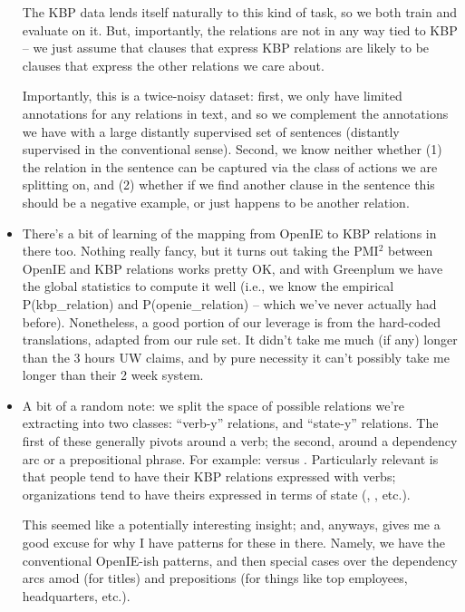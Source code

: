 \begin{itemize}
    The KBP data lends itself naturally to this kind of task, so we both
    train and evaluate on it. But, importantly, the relations are not
    in any way tied to KBP -- we just assume that clauses that express
    KBP relations are likely to be clauses that express the other relations
    we care about.

    Importantly, this is a twice-noisy dataset: first, we only have limited
    annotations for any relations in text, and so we complement the annotations
    we have with a large distantly supervised set of sentences (distantly supervised
    in the conventional sense).
    Second, we know neither whether (1) the relation in the sentence can be captured
    via the class of actions we are splitting on, and (2) whether if we find another
    clause in the sentence this should be a negative example, or just happens to be
    another relation.

  \item There's a bit of learning of the mapping from OpenIE to KBP
    relations in there too. Nothing really fancy, but it turns out
    taking the PMI$^2$ between OpenIE and KBP relations works pretty OK,
    and with Greenplum we have the global statistics to compute it well
    (i.e., we know the empirical P(kbp\_relation) and P(openie\_relation) --
    which we've never actually had before).
    Nonetheless, a good portion of our leverage is from the hard-coded
    translations, adapted from our rule set.
    It didn't take me much (if any) longer than the 3 hours UW claims,
    and by pure necessity it can't possibly take me longer than their
    2 week system.
  
  \item A bit of a random note: 
      we split the space of possible relations we're extracting into two classes:
      ``verb-y'' relations, and ``state-y'' relations. The first of these
      generally pivots around a verb; the second, around a dependency
      arc or a prepositional phrase. For example:
       versus
      .
      Particularly relevant is that people tend to have their KBP relations
      expressed with verbs; organizations tend to have theirs expressed
      in terms of state (,
      , etc.).

      This seemed like a potentially interesting insight; and, anyways,
      gives me a good excuse for why I have patterns for these in there.
      Namely, we have the conventional OpenIE-ish patterns, and then
      special cases over the dependency arcs amod (for titles) and
      prepositions (for things like top employees, headquarters, etc.).
\end{itemize}


